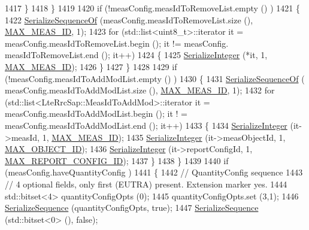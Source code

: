 \begin{DoxyCode}
1417         \}
1418     \}
1419 
1420   \textcolor{keywordflow}{if} (!measConfig.measIdToRemoveList.empty () )
1421     \{
1422       \hyperlink{classns3_1_1Asn1Header_a066b6dd077bde6b0c243f3eda2621277}{SerializeSequenceOf} (measConfig.measIdToRemoveList.size (), 
      \hyperlink{lte-rrc-header_8cc_aa360afec99420ceee80ed487493f6a9d}{MAX\_MEAS\_ID}, 1);
1423       \textcolor{keywordflow}{for} (std::list<uint8\_t>::iterator it = measConfig.measIdToRemoveList.begin (); it != measConfig.
      measIdToRemoveList.end (); it++)
1424         \{
1425           \hyperlink{classns3_1_1Asn1Header_ab1c3bd37730affa7473bc759d625c29a}{SerializeInteger} (*it, 1, \hyperlink{lte-rrc-header_8cc_aa360afec99420ceee80ed487493f6a9d}{MAX\_MEAS\_ID});
1426         \}
1427     \}
1428 
1429   \textcolor{keywordflow}{if} (!measConfig.measIdToAddModList.empty () )
1430     \{
1431       \hyperlink{classns3_1_1Asn1Header_a066b6dd077bde6b0c243f3eda2621277}{SerializeSequenceOf} ( measConfig.measIdToAddModList.size (), 
      \hyperlink{lte-rrc-header_8cc_aa360afec99420ceee80ed487493f6a9d}{MAX\_MEAS\_ID}, 1);
1432       \textcolor{keywordflow}{for} (std::list<LteRrcSap::MeasIdToAddMod>::iterator it = measConfig.measIdToAddModList.begin (); it !
      = measConfig.measIdToAddModList.end (); it++)
1433         \{
1434           \hyperlink{classns3_1_1Asn1Header_ab1c3bd37730affa7473bc759d625c29a}{SerializeInteger} (it->measId, 1, \hyperlink{lte-rrc-header_8cc_aa360afec99420ceee80ed487493f6a9d}{MAX\_MEAS\_ID});
1435           \hyperlink{classns3_1_1Asn1Header_ab1c3bd37730affa7473bc759d625c29a}{SerializeInteger} (it->measObjectId, 1, \hyperlink{lte-rrc-header_8cc_ab2de695aee029784062779621283535d}{MAX\_OBJECT\_ID});
1436           \hyperlink{classns3_1_1Asn1Header_ab1c3bd37730affa7473bc759d625c29a}{SerializeInteger} (it->reportConfigId, 1, 
      \hyperlink{lte-rrc-header_8cc_af8a3b931c04f0fa0e31e7c8480ba0bb6}{MAX\_REPORT\_CONFIG\_ID});
1437         \}
1438     \}
1439 
1440   \textcolor{keywordflow}{if} (measConfig.haveQuantityConfig )
1441     \{
1442       \textcolor{comment}{// QuantityConfig sequence}
1443       \textcolor{comment}{// 4 optional fields, only first (EUTRA) present. Extension marker yes.}
1444       std::bitset<4> quantityConfigOpts (0);
1445       quantityConfigOpts.set (3,1);
1446       \hyperlink{classns3_1_1Asn1Header_aa9744858380443ed95836fed08799aed}{SerializeSequence} (quantityConfigOpts, \textcolor{keyword}{true});
1447       \hyperlink{classns3_1_1Asn1Header_aa9744858380443ed95836fed08799aed}{SerializeSequence} (std::bitset<0> (), \textcolor{keyword}{false});

\end{DoxyCode}
